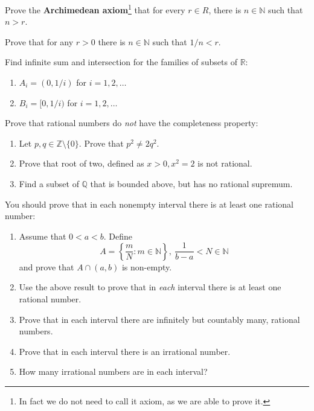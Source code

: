 \begin{exercise}
  Prove the \textbf{Archimedean axiom}\footnote{In fact we do not
  need to call it axiom, as we are able to prove it.}
  that for every $r\in R$, there is $n\in \mathbb N$ such that $n>r$.
\end{exercise}

\begin{exercise}
  Prove that for any $r>0$ there is $n\in \mathbb N$ such that
  $1/n < r$.
\end{exercise}

\begin{exercise} Find infinite sum and intersection for the families of subsets of $\mathbb{R}$:
  \begin{enumerate}
    \item $A_i=(0,1/i)$ for $i=1,2,\dots$
    \item $B_i=[0,1/i)$ for $i=1,2,\dots$
  \end{enumerate}
\end{exercise}

\begin{exercise}
  Prove that rational numbers do \textit{not} have the completeness
  property:
  \begin{enumerate}
    \item Let $p, q\in \mathbb Z\setminus \{0\}$.
      Prove that $p^2\neq 2q^2$.
    \item Prove that root of two, defined as
      $x > 0, x^2=2$ is not rational.
    \item Find a subset of $\mathbb Q$ that is bounded above, but
      has no rational supremum.
  \end{enumerate}
\end{exercise}

\begin{exercise}
  You should prove that in each nonempty interval there is at least
  one rational number:
  \begin{enumerate}
    \item Assume that $0<a<b$. Define
      $$A=\left\{\frac m N : m\in \mathbb N\right\},~
      \frac 1{b-a} < N \in \mathbb N$$
      and prove that $A\cap (a,b)$ is non-empty.
    \item Use the above result to prove that in \textit{each}
      interval there is at least one rational number.
    \item Prove that in each interval there are infinitely but countably many, rational numbers.
    \item Prove that in each interval there is an irrational number.
    \item How many irrational numbers are in each interval?
  \end{enumerate}
\end{exercise}


